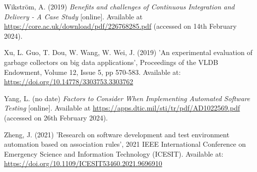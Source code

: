 \noindent Wikström, A. (2019) \textit{Benefits and challenges of Continuous Integration and Delivery - A Case Study} [online]. Available at \url{https://core.ac.uk/download/pdf/226768285.pdf} (accessed on 14th February 2024).
\vspace{0.2cm}

\noindent Xu, L. Guo, T. Dou, W. Wang, W. Wei, J. (2019) 'An experimental evaluation of garbage collectors on big data applications', Proceedings of the VLDB Endowment, Volume 12, Issue 5, pp 570-583. Available at: \url{https://doi.org/10.14778/3303753.3303762}
\vspace{0.2cm}

\noindent Yang, L. (no date) \textit{Factors to Consider When Implementing Automated Software Testing} [online]. Available at \url{https://apps.dtic.mil/sti/tr/pdf/AD1022569.pdf} (accessed on 26th February 2024).
\vspace{0.2cm}

\noindent Zheng, J. (2021) 'Research on software development and test environment automation based on association rules', 2021 IEEE International Conference on Emergency Science and Information Technology (ICESIT). Available at: \url{https://doi.org/10.1109/ICESIT53460.2021.9696910}
\vspace{0.2cm}

\newpage
